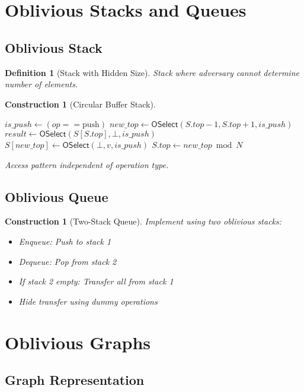 \documentclass[11pt,final,hidelinks]{article}
\newtheorem{definition}[theorem]{Definition}
\newtheorem{construction}[theorem]{Construction}
\begin{document}
\section{Oblivious Stacks and Queues}

\subsection{Oblivious Stack}

\begin{definition}[Stack with Hidden Size]
Stack where adversary cannot determine number of elements.
\end{definition}

\begin{construction}[Circular Buffer Stack]
\begin{algorithm}[H]
\caption{Oblivious Stack Push/Pop}
$is\_push \gets (op == \text{push})$\;
$new\_top \gets \mathsf{OSelect}(S.top - 1, S.top + 1, is\_push)$\;
$result \gets \mathsf{OSelect}(S[S.top], \bot, is\_push)$\;
$S[new\_top] \gets \mathsf{OSelect}(\bot, v, is\_push)$\;
$S.top \gets new\_top \bmod N$\;
\end{algorithm}
Access pattern independent of operation type.
\end{construction}

\subsection{Oblivious Queue}

\begin{construction}[Two-Stack Queue]
Implement using two oblivious stacks:
\begin{itemize}
    \item Enqueue: Push to stack 1
    \item Dequeue: Pop from stack 2
    \item If stack 2 empty: Transfer all from stack 1
    \item Hide transfer using dummy operations
\end{itemize}
\end{construction}

\section{Oblivious Graphs}

\subsection{Graph Representation}
\end{document}
